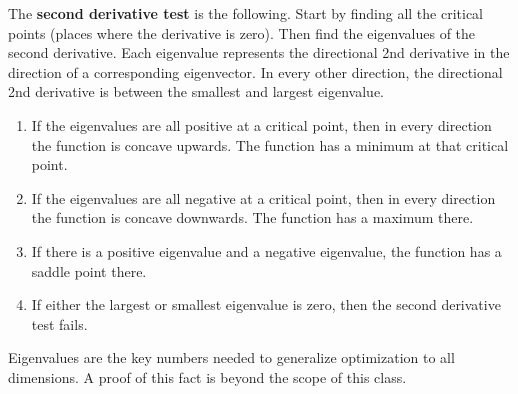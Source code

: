 %
The \textbf{second derivative test} is the following. Start by finding all the critical points (places where the derivative is zero). Then find the eigenvalues of the second derivative. Each eigenvalue represents the directional 2nd derivative in the direction of a corresponding eigenvector. In every other direction, the directional 2nd derivative is between the smallest and largest eigenvalue.  
\begin{enumerate}
	\item If the eigenvalues are all positive at a critical point, then in every direction the function is concave upwards. The function has a minimum at that critical point.
	\item If the eigenvalues are all negative at a critical point, then in every direction the function is concave downwards. The function has a maximum there.
	\item If there is a positive eigenvalue and a negative eigenvalue, the function has a saddle point there.  
	\item If either the largest or smallest eigenvalue is zero, then the second derivative test fails. 
\end{enumerate}
Eigenvalues are the key numbers needed to generalize optimization to all dimensions. A proof of this fact is beyond the scope of this class. 

